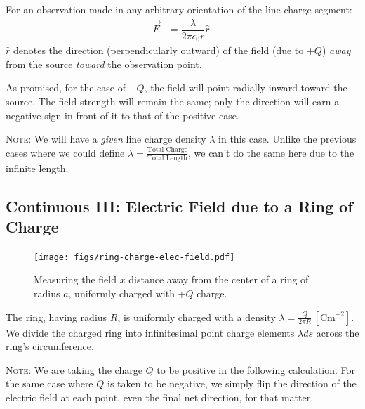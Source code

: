 \documentclass[12pt,b4paper]{article}
\begin{document}
For an observation made in any arbitrary orientation of the line charge segment:
\begin{align}
    \vec{E}&=\dfrac{\lambda}{2\pi\epsilon_0r}\hat{r}.
\end{align}
$\hat{r}$ denotes the direction (perpendicularly outward) of the field (due to $+Q$) \textit{away} from the source \textit{toward} the observation point.

As promised, for the case of $-Q$, the field will point radially inward toward the source. The field strength will remain the same; only the direction will earn a negative sign in front of it to that of the positive case.

\textsc{Note}: We will have a \textit{given} line charge density $\lambda$ in this case. Unlike the previous cases where we could define $\displaystyle\lambda=\frac{\text{Total Charge}}{\text{Total Length}}$, we can't do the same here due to the infinite length. 
\subsection{Continuous III: Electric Field due to a Ring of Charge}
\begin{figure}[H]
    \centering
    \texttt{[image: figs/ring-charge-elec-field.pdf]}
    \caption{Measuring the field $x$ distance away from the center of a ring of radius $a$, uniformly charged with $+Q$ charge.}
    \label{fig:ring-charge-elec-field}
\end{figure}
The ring, having radius $R$, is uniformly charged with a density $\displaystyle\lambda=\frac{Q}{2\pi R}\,[\unit{\coulomb\meter}^{-2}]$. We divide the charged ring into infinitesimal point charge elements $\lambda ds$ across the ring's circumference. 

\textsc{Note}: We are taking the charge $Q$ to be positive in the following calculation. For the same case where $Q$ is taken to be negative, we simply flip the direction of the electric field at each point, even the final net direction, for that matter.
\end{document}

